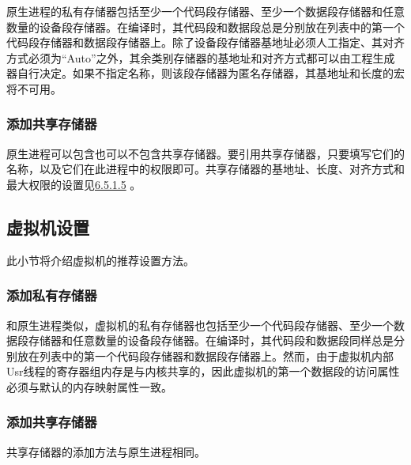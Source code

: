 原生进程的私有存储器包括至少一个代码段存储器、至少一个数据段存储器和任意数量的设备段存储器。在编译时，其代码段和数据段总是分别放在列表中的第一个代码段存储器和数据段存储器上。除了设备段存储器基地址必须人工指定、其对齐方式必须为``Auto''之外，其余类别存储器的基地址和对齐方式都可以由工程生成器自行决定。如果不指定名称，则该段存储器为匿名存储器，其基地址和长度的宏将不可用。

\subsubsection{添加共享存储器}\label{subsubsec:6-5-4-2}

原生进程可以包含也可以不包含共享存储器。要引用共享存储器，只要填写它们的名称，以及它们在此进程中的权限即可。共享存储器的基地址、长度、对齐方式和最大权限的设置见\protect\hyperref[subsubsec:6-5-1-5]{6.5.1.5}
。

\subsection{虚拟机设置}\label{subsec:6-5-5}

此小节将介绍虚拟机的推荐设置方法。

\subsubsection{添加私有存储器}\label{subsubsec:6-5-5-1}

和原生进程类似，虚拟机的私有存储器也包括至少一个代码段存储器、至少一个数据段存储器和任意数量的设备段存储器。在编译时，其代码段和数据段同样总是分别放在列表中的第一个代码段存储器和数据段存储器上。然而，由于虚拟机内部Usr线程的寄存器组内存是与内核共享的，因此虚拟机的第一个数据段的访问属性必须与默认的内存映射属性一致。

\subsubsection{添加共享存储器}\label{subsubsec:6-5-5-2}

共享存储器的添加方法与原生进程相同。

